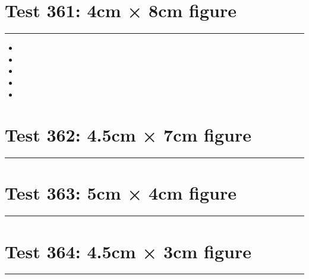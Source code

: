 \documentclass[a4paper,11pt]{article}
\begin{document}
\section*{Test 361: 4cm × 8cm figure}
\begin{swarmwrap}%
  \begin{minipage}[t]{4cm}
    \centering
    \rule{\linewidth}{8cm}
  \end{minipage}%
\end{swarmwrap}%
\swarmwrapnext
\lipsum[102]
\begin{itemize}
  \item \lipsum[103][1-3]
  \item \lipsum[104][1-3]
  \item \lipsum[105][1-3]
  \item \lipsum[106][1-3]
  \item \lipsum[107][1-3]
\end{itemize}
\section*{Test 362: 4.5cm × 7cm figure}
\begin{swarmwrap}%
  \begin{minipage}[t]{4cm}
    \centering
    \rule{\linewidth}{7cm}
  \end{minipage}%
\end{swarmwrap}%
\swarmwrapnext
\lipsum[87]
\lipsum[88]
\lipsum[89]
\lipsum[90]
\section*{Test 363: 5cm × 4cm figure}
\begin{swarmwrap}%
  \begin{minipage}[t]{5cm}
    \centering
    \rule{\linewidth}{4cm}
  \end{minipage}%
\end{swarmwrap}%
\swarmwrapnext
\lipsum[132]
\lipsum[133]
\lipsum[134]
\section*{Test 364: 4.5cm × 3cm figure}
\begin{swarmwrap}%
  \begin{minipage}[t]{4cm}
    \centering
    \rule{\linewidth}{3cm}
  \end{minipage}%
\end{swarmwrap}%
\swarmwrapnext
\lipsum[91]
\lipsum[92]
\lipsum[93]
\lipsum[94]
\end{document}
